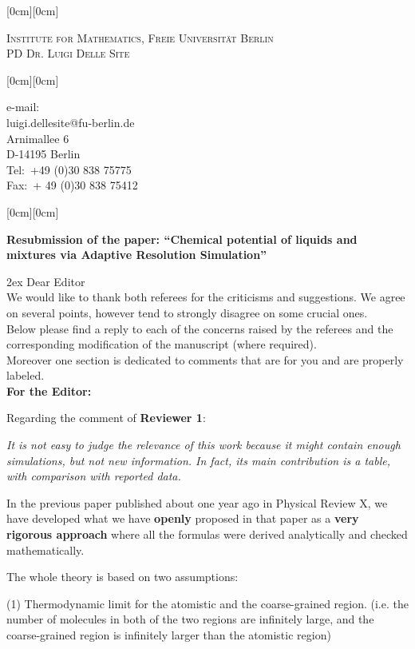 \documentclass[12pt]{article}
\newcommand{\redc}[1]{{\color{red} #1}}
\newcommand{\kopf}{\noindent
\raisebox{2.5cm}[0cm][0cm]
{
\parbox[c]{0.88\textwidth}
{
\begin{center}
\textsc{\large Institute for Mathematics, Freie Universit\"{a}t Berlin}\\
\textsc{ PD Dr. Luigi Delle Site}
\end{center}
}
}}
\begin{document}
\kopf
\vspace{2cm}
\hfill\raisebox{1.5cm}[0cm][0cm]
{\parbox[t]{0.34\textwidth}
{e-mail:\\
{\small luigi.dellesite@fu-berlin.de}\\
Arnimallee 6\\
D-14195 Berlin\\
Tel:\ +49 (0)30 838 75775 \\
Fax:\ + 49 (0)30 838 75412 \\
}}

\vspace{3cm}
\noindent\raisebox{1.5cm}[0cm][0cm]
{}
\vspace{1cm}

\textbf{Resubmission of the paper: ``Chemical potential of liquids and mixtures via Adaptive Resolution Simulation''}

\vspace{1cm}
\parskip 2ex
Dear Editor\\
We would like to thank both referees for the criticisms and suggestions.
We agree on several points, however tend to strongly disagree on some crucial ones.\\
Below please find a reply to each of the concerns raised by the referees and the
corresponding modification of the manuscript (where required).\\
Moreover one section is dedicated to comments that are for you and are properly labeled.\\

{\bf For the Editor:}

Regarding the comment of {\bf Reviewer 1}:

{\it  It is not easy to judge the relevance of this
  work because it might contain enough simulations, but not new information. In fact, its main contribution is a table, with comparison with reported data.}

In the previous paper published about one year ago in Physical Review X,
we have developed what we have {\bf openly} proposed in that paper as a {\bf very rigorous approach} where all the formulas were derived analytically and checked mathematically.

The whole theory is based on two assumptions:

(1) Thermodynamic limit for the \redc{atomistic and the coarse-grained region. (i.e. the number of molecules in both of the two
  regions are infinitely large, and the coarse-grained region is infinitely larger than the atomistic region)}  
\end{document}
